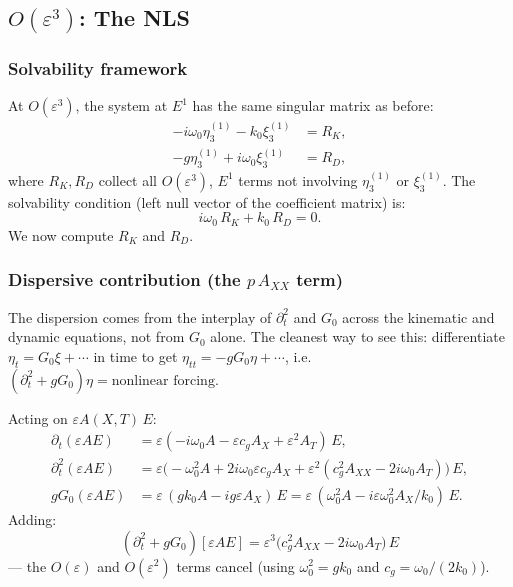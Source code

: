 \documentclass[11pt]{article}
\newcommand{\eps}{\varepsilon}
\begin{document}
\subsection{$O(\eps^3)$: The NLS}

\subsubsection{Solvability framework}

At $O(\eps^3)$, the system at $E^1$ has the same singular matrix as before:
\begin{align}
-i\omega_0\eta_3^{(1)} - k_0\xi_3^{(1)} &= R_K, \label{eq:sys3_K}\\
-g\eta_3^{(1)} + i\omega_0\xi_3^{(1)} &= R_D, \label{eq:sys3_D}
\end{align}
where $R_K, R_D$ collect all $O(\eps^3)$, $E^1$ terms not involving
$\eta_3^{(1)}$ or $\xi_3^{(1)}$.
The solvability condition (left null vector of the coefficient matrix) is:
\begin{equation}
i\omega_0\,R_K + k_0\,R_D = 0.
\label{eq:solvability}
\end{equation}
We now compute $R_K$ and $R_D$.

\subsubsection{Dispersive contribution (the $p\,A_{XX}$ term)}

The dispersion comes from the interplay of $\partial_t^2$ and $G_0$
across the kinematic and dynamic equations, not from $G_0$ alone.
The cleanest way to see this: differentiate $\eta_t = G_0\xi + \cdots$
in time to get $\eta_{tt} = -gG_0\eta + \cdots$, i.e.\
$(\partial_t^2 + gG_0)\eta = \text{nonlinear forcing}$.

Acting on $\eps A(X,T)\,E$:
\begin{align}
\partial_t(\eps AE) &= \eps(-i\omega_0 A - \eps c_g A_X + \eps^2 A_T)\,E,
\\
\partial_t^2(\eps AE) &= \eps\bigl(-\omega_0^2 A
+ 2i\omega_0\eps c_g A_X
+ \eps^2(c_g^2 A_{XX} - 2i\omega_0 A_T)\bigr)\,E,
\\
gG_0(\eps AE) &= \eps\,(gk_0 A - ig\eps A_X)\,E
= \eps\,(\omega_0^2 A - i\eps\omega_0^2 A_X/k_0)\,E.
\end{align}
Adding:
\[
(\partial_t^2 + gG_0)[\eps AE]
= \eps^3\bigl(c_g^2 A_{XX} - 2i\omega_0 A_T\bigr)\,E
\]
--- the $O(\eps)$ and $O(\eps^2)$ terms cancel
(using $\omega_0^2 = gk_0$ and $c_g = \omega_0/(2k_0)$).
\end{document}
